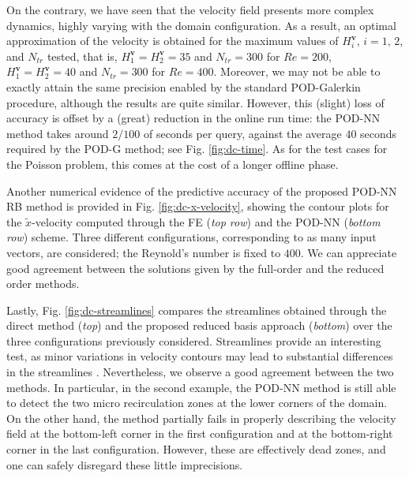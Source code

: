 \documentclass[longtitle]{elsarticle}
\numberwithin{equation}{section}
\theoremstyle{theorem}
\theoremstyle{definition}
\theoremstyle{remark}
\theoremstyle{proposition}
\numberwithin{figure}{section}
\newcommand{\wt}[1]{\widetilde{#1}}
\newcommand{\bg}[1]{\boldsymbol{#1}}
\begin{document}
		On the contrary, we have seen that the velocity field presents more complex dynamics, highly varying with the domain configuration. As a result, an optimal approximation of the velocity is obtained for the maximum values of $H_i^{\bg{v}}$, $i = 1, \, 2$, and $N_{tr}$ tested, that is, $H_1^{\bg{v}} = H_2^{\bg{v}} = 35$ and $N_{tr} = 300$ for $Re = 200$, $H_1^{\bg{v}} = H_2^{\bg{v}} = 40$ and $N_{tr} = 300$ for $Re = 400$. Moreover, we may not be able to exactly attain the same precision enabled by the standard POD-Galerkin procedure, although the results are quite similar. However, this (slight) loss of accuracy is offset by a (great) reduction in the online run time: the POD-NN method takes around $2/100$ of seconds per query, against the average $40$ seconds required by the POD-G method; see Fig. \ref{fig:dc-time}. As for the test cases for the Poisson problem, this comes at the cost of a longer offline phase.				
				
		Another numerical evidence of the predictive accuracy of the proposed POD-NN RB method is provided in Fig. \ref{fig:dc-x-velocity}, showing the contour plots for the $\wt{x}$-velocity computed through the FE (\emph{top row}) and the POD-NN (\emph{bottom row}) scheme. Three different configurations, corresponding to as many input vectors, are considered; the Reynold's number is fixed to $400$. We can appreciate good agreement between the solutions given by the full-order and the reduced order methods. 
														
		Lastly, Fig. \ref{fig:dc-streamlines} compares the streamlines obtained through the direct method (\emph{top}) and the proposed reduced basis approach (\emph{bottom}) over the three configurations previously considered. Streamlines provide an interesting test, as minor variations in velocity contours may lead to substantial differences in the streamlines \cite{Chen17}. Nevertheless, we observe a good agreement between the two methods. In particular, in the second example, the POD-NN method is still able to detect the two micro recirculation zones at the lower corners of the domain. On the other hand, the method partially fails in properly describing the velocity field at the bottom-left corner in the first configuration and at the bottom-right corner in the last configuration. However, these are effectively dead zones, and one can safely disregard these little imprecisions.
				
\end{document}

